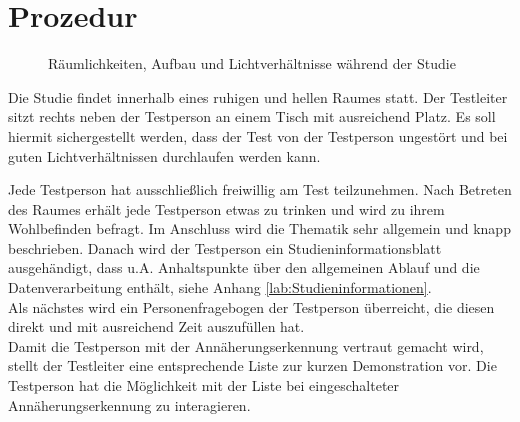 \documentclass[a4paper,12pt,bibliography=totoc]{scrreprt}%
\begin{document}
\section{Prozedur}
\begin{figure}
\centering
{}
\caption{Räumlichkeiten, Aufbau und Lichtverhältnisse während der Studie}
\label{klickschwebepositionen}
\end{figure}
Die Studie findet innerhalb eines ruhigen und hellen Raumes statt. Der Testleiter sitzt rechts neben der Testperson an einem Tisch mit ausreichend Platz. Es soll hiermit sichergestellt werden, dass der Test von der Testperson ungestört und bei guten Lichtverhältnissen durchlaufen werden kann.

Jede Testperson hat ausschließlich freiwillig am Test teilzunehmen. Nach Betreten des Raumes erhält jede Testperson etwas zu trinken und wird zu ihrem Wohlbefinden befragt. Im Anschluss wird die Thematik sehr allgemein und knapp beschrieben. Danach wird der Testperson ein Studieninformationsblatt ausgehändigt, dass u.A. Anhaltspunkte über den allgemeinen Ablauf und die Datenverarbeitung enthält, siehe Anhang \ref{lab:Studieninformationen}.\\
Als nächstes wird ein Personenfragebogen der Testperson überreicht, die diesen direkt und mit ausreichend Zeit auszufüllen hat.\\
Damit die Testperson mit der Annäherungserkennung vertraut gemacht wird, stellt der Testleiter eine entsprechende Liste zur kurzen Demonstration vor. Die Testperson hat die Möglichkeit mit der Liste bei eingeschalteter Annäherungserkennung zu interagieren.
\end{document}
